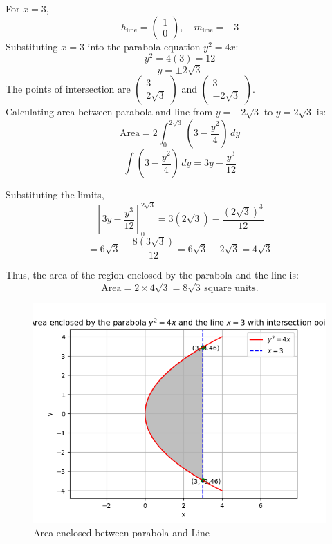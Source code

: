 \documentclass[journal]{IEEEtran}
\begin{document}
For $x = 3$,
\begin{equation}
h_{\text{line}} = \begin{pmatrix} 1 \\ 0 \end{pmatrix}, \quad m_{\text{line}} = -3
\end{equation}
Substituting $x = 3$ into the parabola equation $y^2 = 4x$:
\begin{equation}
y^2 = 4(3) = 12
\end{equation}
\begin{equation}
y = \pm 2\sqrt{3}
\end{equation}
The points of intersection are $\begin{pmatrix} 3 \\ 2\sqrt{3} \end{pmatrix}$ and $\begin{pmatrix} 3 \\ -2\sqrt{3} \end{pmatrix}$.\\
Calculating area between parabola and line from $y = -2\sqrt{3}$ to $y = 2\sqrt{3}$ is:
\begin{equation}
\text{Area} = 2 \int_{0}^{2\sqrt{3}} \left( 3 - \frac{y^2}{4} \right) \, dy
\end{equation}
\begin{equation}
\int \left( 3 - \frac{y^2}{4} \right) \, dy = 3y - \frac{y^3}{12}
\end{equation}

Substituting the limits,
\begin{equation}
\left[ 3y - \frac{y^3}{12} \right]_{0}^{2\sqrt{3}} = 3(2\sqrt{3}) - \frac{(2\sqrt{3})^3}{12}
\end{equation}
\begin{equation}
= 6\sqrt{3} - \frac{8(3\sqrt{3})}{12} = 6\sqrt{3} - 2\sqrt{3} = 4\sqrt{3}
\end{equation}

Thus, the area of the region enclosed by the parabola and the line is:
\begin{equation}
\text{Area} = 2 \times 4\sqrt{3} = 8\sqrt{3} \, \text{square units}.
\end{equation}
\begin{figure}[h!]
	\centering
	\includegraphics[width=0.5\linewidth]{figs/Figure_1.png}
	\caption{Area enclosed between parabola and Line}
	\label{stemplot}
\end{figure}	
\end{document}
